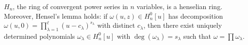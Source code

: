 $H_n$, the ring of convergent power series in $n$ variables, is a henselian ring. Moreover, Hensel's lemma holds: if $\omega(u, z) \in H_n^0[u]$ has decomposition $\omega(u, 0) = \prod_{\lambda=1}^{\ell} (u - c_\lambda)^{s_\lambda}$ with distinct $c_\lambda$, then there exist uniquely determined polynomials $\omega_\lambda \in H_n^0[u]$ with $\deg(\omega_\lambda) = s_\lambda$ such that $\omega = \prod \omega_\lambda$.
